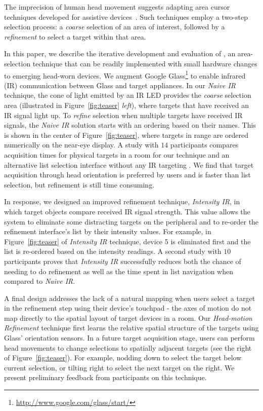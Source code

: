 The imprecision of human head movement suggests adapting area cursor techniques developed for assistive devices~\cite{kabbash1995prince,worden1997making,findlater2010enhanced}. Such techniques employ a two-step selection process: a {\em coarse} selection of an area of interest, followed by a {\em refinement} to select a target within that area.

In this paper, we describe the iterative development and evaluation of \systemnamenospace, an area-selection technique that can be readily implemented with small hardware changes to emerging head-worn devices. We augment Google Glass\footnote{\url{http://www.google.com/glass/start/}} to enable infrared (IR) communication between Glass and target appliances. In our {\em Naive IR} technique, the cone of light emitted by an IR LED %
 provides the {\em coarse} selection area (illustrated in Figure~\ref{fig:teaser} {\em left}), where targets that have received an IR signal light up. To {\em refine} selection when multiple targets have received IR signals, the {\em Naive IR} solution starts with an ordering based on their names. This is shown in the center of Figure~\ref{fig:teaser}, where targets in range are ordered numerically on the near-eye display. A study with $14$ participants compares acquisition times for physical targets in a room for our technique and an alternative list selection interface without any IR targeting . We find that target acquisition through head orientation is preferred by users and is faster than list selection, but refinement is still time consuming.

In response, we designed an improved refinement technique, {\em Intensity IR}, in which target objects compare received IR signal strength. This value allows the system to eliminate some distracting targets on the peripheral and to re-order the refinement interface's list by their intensity values. For example, in Figure~\ref{fig:teaser} of {\em Intensity IR} technique, device 5 is eliminated first and the list is re-ordered based on the intensity readings. A second study with $10$ participants proves that {\em Intensity IR} successfully reduces both the chance of needing to do refinement as well as the time spent in list navigation when compared to {\em Naive IR}.

A final design addresses the lack of a natural mapping when users select a target in the refinement step using their device's touchpad - the axes of motion do not map directly to the spatial layout of target devices in a room. Our {\em Head-motion Refinement} technique first learns the relative spatial structure of the targets using Glass' orientation sensors. In a future target acquisition stage, users can perform head movements to change selections to spatially adjacent targets (see the right of Figure~\ref{fig:teaser}). For example, nodding down to select the target below current selection, or tilting right to select the next target on the right. We present preliminary feedback from participants on this technique.

